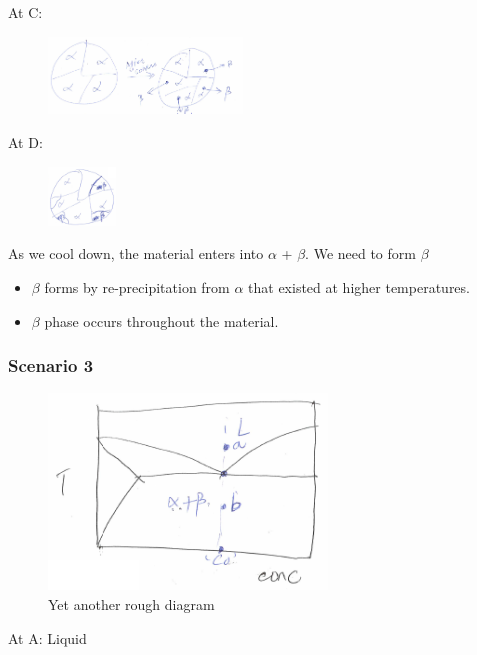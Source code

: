 \documentclass{article}
\begin{document}
At C:\begin{figure}[h!]
	\centering
	\includegraphics[width=0.46\textwidth]{assets/6584bc34.png}
\end{figure}

At D: 
\begin{figure}[h!]
	\centering
	\includegraphics[width=0.16\textwidth]{assets/4ffbff85.png}
\end{figure}

As we cool down, the material enters into $\alpha$ + $\beta$. We need to form $\beta$
\begin{itemize}
    \item $\beta$ forms by re-precipitation from $\alpha$ that existed at higher temperatures.
    \item $\beta$ phase occurs throughout the material.
\end{itemize}

\subsubsection{Scenario 3}

\begin{figure}[H]
	\centering
	\includegraphics[width=0.66\textwidth]{assets/71711602.png}
    \caption{Yet another rough diagram}
    \label{fig:my_label}
\end{figure}

At A: Liquid
\end{document}
